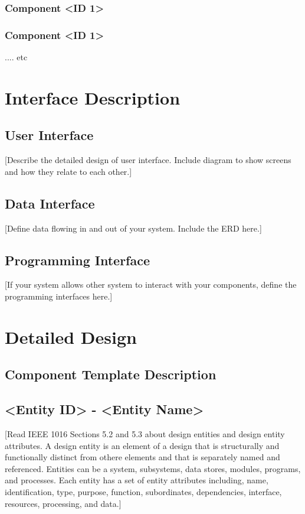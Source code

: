 \documentclass{article}
\begin{document}
\subsubsection{Component <ID 1>}

\subsubsection{Component <ID 1>}
.... etc

\section{Interface Description}

\subsection{User Interface}

[Describe the detailed design of user interface.  Include diagram to show screens and how they relate to each other.]

\subsection{Data Interface}
[Define data flowing in and out of your system.  Include the ERD here.]

\subsection{Programming Interface} 
[If your system allows other system to interact with your components, define the programming interfaces here.]

\newpage

\section{Detailed Design}

\subsection{Component Template Description}

\subsection{<Entity ID> - <Entity Name>}
 [Read IEEE 1016 Sections 5.2 and 5.3 about design entities and design entity attributes.  
A design entity is an element of a design that is structurally and functionally distinct from othere elements and that is separately named and referenced.  Entities can be a system, subsystems, data stores, modules, programs, and processes.  Each entity has a set of entity attributes including, name, identification, type, purpose, function, subordinates, dependencies, interface, resources, processing, and data.]
\end{document}
